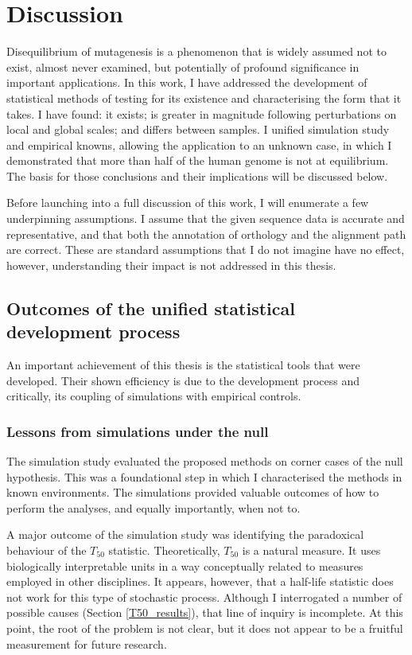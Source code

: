 \chapter{Discussion}

Disequilibrium of mutagenesis is a phenomenon that is widely assumed not to exist, almost never examined, but potentially of profound significance in important applications. In this work, I have addressed the development of statistical methods of testing for its existence and characterising the form that it takes. I have found: it exists; is greater in magnitude following perturbations on local and global scales; and differs between samples. I unified simulation study and empirical knowns, allowing the application to an unknown case, in which I demonstrated that more than half of the human genome is not at equilibrium. The basis for those conclusions and their implications will be discussed below. 

Before launching into a full discussion of this work, I will enumerate a few underpinning assumptions. I assume that the given sequence data is accurate and representative, and that both the annotation of orthology and the alignment path are correct. These are standard assumptions that I do not imagine have no effect, however, understanding their impact is not addressed in this thesis. 

\section{Outcomes of the unified statistical development process}
An important achievement of this thesis is the statistical tools that were developed. Their shown efficiency is due to the development process and critically, its coupling of simulations with empirical controls. 

\subsection{Lessons from simulations under the null}
The simulation study evaluated the proposed methods on corner cases of the null hypothesis. This was a foundational step in which I characterised the methods in known environments. The simulations provided valuable outcomes of how to perform the analyses, and equally importantly, when not to. 

A major outcome of the simulation study was identifying the paradoxical behaviour of the $T_{50}$ statistic. Theoretically, $T_{50}$ is a natural measure. It uses biologically interpretable units in a way conceptually related to measures employed in other disciplines. It appears, however, that a half-life statistic does not work for this type of stochastic process. Although I interrogated a number of possible causes  (Section \ref{T50_results}), that line of inquiry is incomplete. At this point, the root of the problem is not clear, but it does not appear to be a fruitful measurement for future research. 

